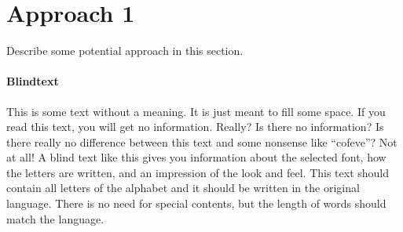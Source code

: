 \section{Approach 1} \label{approach1}  %

Describe some potential approach in this section.

\paragraph{Blindtext} This is some text without a meaning. It is just meant to fill some space. If you read this text, you will get no information. Really? Is there no information? Is there really no difference between this text and some nonsense like ``cofeve''? Not at all! A blind text like this gives you information about the selected font, how the letters are written, and an impression of the look and feel. This text should contain all letters of the alphabet and it should be written in the original language. There is no need for special contents, but the length of words should match the language.
